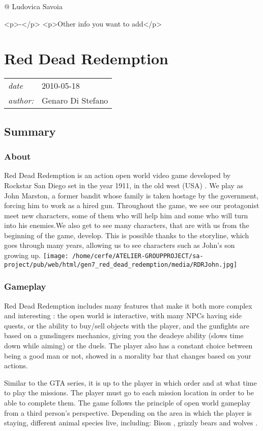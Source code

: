 \documentclass[a4paper,10pt]{book}
\newcommand{\pageHeader}[4]{
    \section{#1}
    \vspace{-0.3cm}
    \begin{table}[h!]
     \begin{tabular}{ll}
        \hline
        \textit{date} & #2 \\
        \textit{author: } & #3\\
        \hline
     \end{tabular}
    \end{table}
    \vspace{-0.3cm}
}
\begin{document}
 @ Ludovica Savoia 
 
            <p>-</p>
            <p>Other info you want to add</p>
           
 
 \newpage\pageHeader{Red Dead Redemption}{2010-05-18}{Genaro Di Stefano}{A realistic wild west game}
 \subsection{Summary }
 \subsubsection{About }
 
          Red Dead Redemption is an action open world video game developed by Rockstar San Diego set in the year 1911, in the old west (USA) . We play as John Marston, a former bandit whose family is taken hostage by the government, forcing him to work as a hired gun. Throughout the game, we see our protagonist meet new characters, some of them who will help him and some who will turn into his enemies.We also get to see many characters, that are with us from the beginning of the game, develop. This is possible thanks to the storyline, which goes through many years, allowing us to see characters such as John's son growing up.
             \texttt{[image: /home/cerfe/ATELIER-GROUPPROJECT/sa-project/pub/web/html/gen7\_red\_dead\_redemption/media/RDRJohn.jpg]}
 \subsubsection{Gameplay }
 
      Red Dead Redemption includes many features that make it both more complex and interesting : the open world is interactive, with many NPCs having side quests, or the ability to buy/sell objects with the player, and the gunfights are based on a gunslingers mechanics, giving you the deadeye ability (slows time down while aiming) or the duels. The player also has a constant choice between being a good man or not, showed in a morality bar that changes based on your actions.
         
 Similar to the GTA series, it is up to the player in which order and at what time to play the missions. The player must go to each mission location in order to be able to complete them. The game follows the principle of open world gameplay from a third person's perspective. Depending on the area in which the player is staying, different animal species live, including: Bison , grizzly bears and wolves .   
\end{document}
